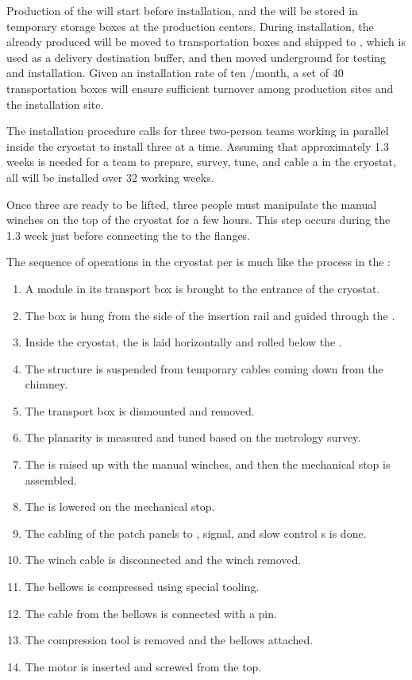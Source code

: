 Production of the  will start before installation, and the  will be stored in temporary storage boxes at the production centers. During installation, the already produced  will be moved to transportation boxes and shipped to , which is used as a delivery destination buffer, and then  moved underground for testing and installation. Given an installation rate of ten /month, a set of \num{40} transportation boxes will ensure sufficient turnover among production sites and the installation site.

The installation procedure  calls for three two-person teams working in parallel inside the cryostat to install three  at a time. Assuming that 
approximately \num{1.3} weeks is needed for a team to prepare, survey, tune, and cable a  in the  cryostat, all \dptotcrp {} will be installed over \num{32} working weeks.

Once three  are ready to be lifted, three people must manipulate the manual winches on the top of the cryostat for a few hours. This step occurs during the \num{1.3} week just before  connecting the  to the flanges. 

The sequence of operations in the cryostat per  is much like the process in the : 
\begin{enumerate}
\item A  module in its transport box is brought to the entrance of the cryostat.
\item The box is hung from the side of the insertion rail and guided through the .
\item  Inside the cryostat, the  is laid horizontally and rolled below the .
\item The structure is suspended from temporary cables coming down from the chimney.
\item The transport box is dismounted and removed.
\item The  planarity is measured and tuned based on the metrology survey.
\item The  is raised up with the manual winches, and then the mechanical stop is assembled.
\item The  is lowered on the mechanical stop.
\item The cabling of the  patch panels to , signal, and slow control \fdth{}s is done.
\item The winch cable is disconnected  and the winch removed.
\item The bellows is compressed using special tooling.
\item The cable from the bellows is connected with a pin.
\item The compression tool is removed and the bellows attached.
\item The motor is inserted and screwed from the top.
\end{enumerate}
 

